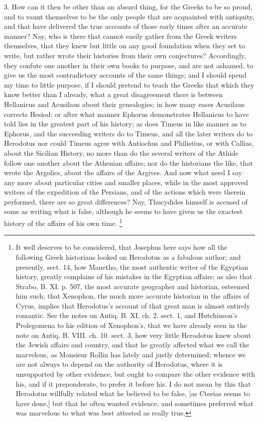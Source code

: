 3. How can it then be other than an absurd thing, for the Greeks to be so
proud, and to vaunt themselves to be the only people that are acquainted
with antiquity, and that have delivered the true accounts of those early
times after an accurate manner? Nay, who is there that cannot easily
gather from the Greek writers themselves, that they knew but little on any
good foundation when they set to write, but rather wrote their histories
from their own conjectures? Accordingly, they confute one another in their
own books to purpose, and are not ashamed. to give us the most
contradictory accounts of the same things; and I should spend my time to
little purpose, if I should pretend to teach the Greeks that which they
know better than I already, what a great disagreement there is between
Hellanicus and Acusilaus about their genealogies; in how many eases
Acusilaus corrects Hesiod: or after what manner Ephorus demonstrates
Hellanicus to have told lies in the greatest part of his history; as does
Timeus in like manner as to Ephorus, and the succeeding writers do to
Timeus, and all the later writers do to Herodotus nor could Timeus agree
with Antiochus and Philistius, or with Callias, about the Sicilian
History, no more than do the several writers of the Athide follow one
another about the Athenian affairs; nor do the historians the like, that
wrote the Argolics, about the affairs of the Argives. And now what need I
say any more about particular cities and smaller places, while in the most
approved writers of the expedition of the Persians, and of the actions
which were therein performed, there are so great differences? Nay,
Thucydides himself is accused of some as writing what is false, although
he seems to have given us the exactest history of the affairs of his own
time. \footnote{It well deserves to be
considered, that Josephus here says how all the following Greek historians
looked on Herodotus as a fabulous author; and presently, sect. 14, how
Manetho, the most authentic writer of the Egyptian history, greatly
complains of his mistakes in the Egyptian affairs; as also that Strabo, B.
XI. p. 507, the most accurate geographer and historian, esteemed him such;
that Xenophon, the much more accurate historian in the affairs of Cyrus,
implies that Herodotus's account of that great man is almost entirely
romantic. See the notes on Antiq. B. XI. ch. 2. sect. 1, and Hutchinson's
Prolegomena to his edition of Xenophon's, that we have already seen in the
note on Antiq. B. VIII. ch. 10. sect. 3, how very little Herodotus knew
about the Jewish affairs and country, and that he greatly affected what we
call the marvelous, as Monsieur Rollin has lately and justly determined;
whence we are not always to depend on the authority of Herodotus, where it
is unsupported by other evidence, but ought to compare the other evidence
with his, and if it preponderate, to prefer it before his. I do not mean
by this that Herodotus willfully related what he believed to be false, [as
Cteeias seems to have done,] but that he often wanted evidence, and
sometimes preferred what was marvelous to what was best attested as really
true.}

